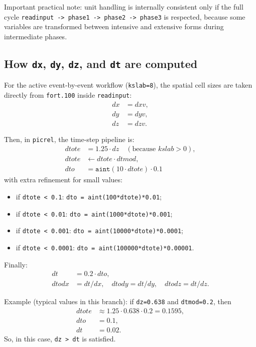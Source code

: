 \documentclass[11pt,a4paper]{article}
\begin{document}
Important practical note:
unit handling is internally consistent only if the full cycle
\texttt{readinput -> phase1 -> phase2 -> phase3} is respected, because some
variables are transformed between intensive and extensive forms during
intermediate phases.

\subsection{How \texttt{dx}, \texttt{dy}, \texttt{dz}, and \texttt{dt} are computed}
For the active event-by-event workflow (\texttt{kslab=8}), the spatial cell
sizes are taken directly from \texttt{fort.100} inside \texttt{readinput}:
\begin{align*}
dx &= dxv,\\
dy &= dyv,\\
dz &= dzv.
\end{align*}

Then, in \texttt{picrel}, the time-step pipeline is:
\begin{align*}
dtote &= 1.25 \cdot dz \quad (\text{because } kslab>0),\\
dtote &\leftarrow dtote \cdot dtmod,\\
dto &= \texttt{aint}(10\cdot dtote)\cdot 0.1
\end{align*}
with extra refinement for small values:
\begin{itemize}
\item if \texttt{dtote < 0.1}: \texttt{dto = aint(100*dtote)*0.01};
\item if \texttt{dtote < 0.01}: \texttt{dto = aint(1000*dtote)*0.001};
\item if \texttt{dtote < 0.001}: \texttt{dto = aint(10000*dtote)*0.0001};
\item if \texttt{dtote < 0.0001}: \texttt{dto = aint(100000*dtote)*0.00001}.
\end{itemize}
Finally:
\begin{align*}
dt &= 0.2 \cdot dto,\\
dtodx &= dt/dx,\quad dtody = dt/dy,\quad dtodz = dt/dz.
\end{align*}

Example (typical values in this branch): if \texttt{dz=0.638} and
\texttt{dtmod=0.2}, then
\begin{align*}
dtote &\approx 1.25\cdot 0.638\cdot 0.2 = 0.1595,\\
dto &= 0.1,\\
dt &= 0.02.
\end{align*}
So, in this case, \texttt{dz > dt} is satisfied.
\end{document}
